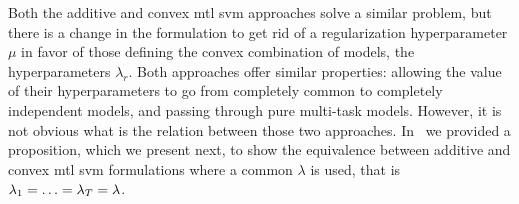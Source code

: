 Both the {additive} and {convex} \acrshort{mtl} \acrshort{svm} approaches solve a similar problem, but there is a change in the formulation to get rid of a regularization hyperparameter $\mu$ in favor of those defining the convex combination of models, the hyperparameters $\lambda_r$.
Both approaches offer similar properties: allowing the value of their hyperparameters to go from completely common to completely independent models, and passing through pure multi-task models.
However, it is not obvious what is the relation between those two approaches.
In~\cite{RuizAD19} we provided a proposition, which we present next, to show the equivalence between {additive} and {convex} \acrshort{mtl} \acrshort{svm} formulations where a common $ \lambda$ is used, that is $\lambda_1 = \ldots = \lambda_T = \lambda$.
